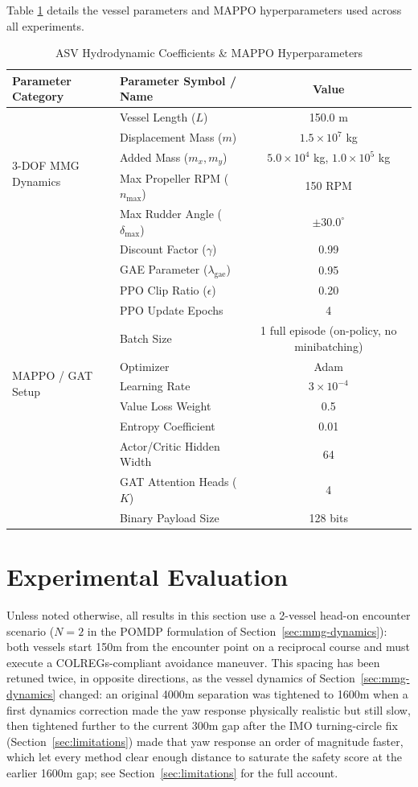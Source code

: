 \documentclass[journal,twocolumn,10pt]{IEEEtran}
\begin{document}
Table \ref{tab:hyperparams} details the vessel parameters and MAPPO hyperparameters used across all experiments.

\begin{table}[t]
\caption{ASV Hydrodynamic Coefficients \& MAPPO Hyperparameters}
\label{tab:hyperparams}
\centering
\begin{tabular}{llc}
\toprule
\textbf{Parameter Category} & \textbf{Parameter Symbol / Name} & \textbf{Value} \\
\midrule
\multirow{5}{*}{3-DOF MMG Dynamics} & Vessel Length ($L$) & 150.0 m \\
 & Displacement Mass ($m$) & $1.5 \times 10^7$ kg \\
 & Added Mass ($m_x, m_y$) & $5.0 \times 10^4$ kg, $1.0 \times 10^5$ kg \\
 & Max Propeller RPM ($n_{\text{max}}$) & 150 RPM \\
 & Max Rudder Angle ($\delta_{\text{max}}$) & $\pm 30.0^\circ$ \\
\midrule
\multirow{12}{*}{MAPPO / GAT Setup} & Discount Factor ($\gamma$) & 0.99 \\
 & GAE Parameter ($\lambda_{\text{gae}}$) & 0.95 \\
 & PPO Clip Ratio ($\epsilon$) & 0.20 \\
 & PPO Update Epochs & 4 \\
 & Batch Size & 1 full episode (on-policy, no minibatching) \\
 & Optimizer & Adam \\
 & Learning Rate & $3 \times 10^{-4}$ \\
 & Value Loss Weight & 0.5 \\
 & Entropy Coefficient & 0.01 \\
 & Actor/Critic Hidden Width & 64 \\
 & GAT Attention Heads ($K$) & 4 \\
 & Binary Payload Size & 128 bits \\
\bottomrule
\end{tabular}
\end{table}

\section{Experimental Evaluation}
\label{sec:experimental-evaluation}
Unless noted otherwise, all results in this section use a 2-vessel head-on encounter scenario ($N=2$ in the POMDP formulation of Section~\ref{sec:mmg-dynamics}): both vessels start 150m from the encounter point on a reciprocal course and must execute a COLREGs-compliant avoidance maneuver. This spacing has been retuned twice, in opposite directions, as the vessel dynamics of Section~\ref{sec:mmg-dynamics} changed: an original 4000m separation was tightened to 1600m when a first dynamics correction made the yaw response physically realistic but still slow, then tightened further to the current 300m gap after the IMO turning-circle fix (Section~\ref{sec:limitations}) made that yaw response an order of magnitude faster, which let every method clear enough distance to saturate the safety score at the earlier 1600m gap; see Section~\ref{sec:limitations} for the full account.
\end{document}
